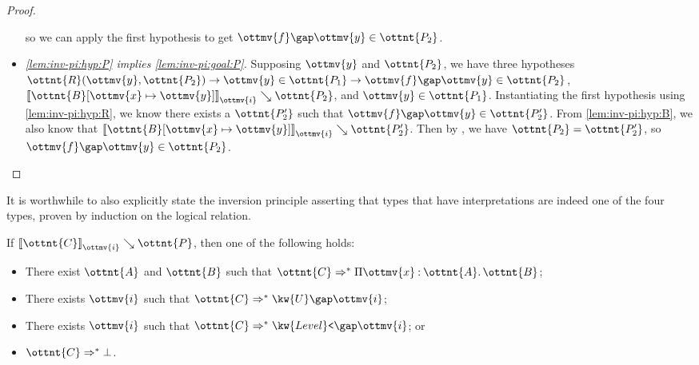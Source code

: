 \documentclass[a4paper,UKenglish,cleveref,autoref,thm-restate]{lipics-v2021}
\begin{document}
\begin{proof}
\begin{itemize}
      so we can apply the first hypothesis to get $  \ottmv{f}  \gap  \ottmv{y}   \in  \ottnt{P_{{\mathrm{2}}}} $.
    \item \textit{\ref{lem:inv-pi:hyp:P} implies \ref{lem:inv-pi:goal:P}.}
      Supposing $\ottmv{y}$ and $\ottnt{P_{{\mathrm{2}}}}$,
      we have three hypotheses $   \ottnt{R} ( \ottmv{y} ,  \ottnt{P_{{\mathrm{2}}}} )   \to   \ottmv{y}  \in  \ottnt{P_{{\mathrm{1}}}}    \to    \ottmv{f}  \gap  \ottmv{y}   \in  \ottnt{P_{{\mathrm{2}}}}  $,
      $ \mathopen{\llbracket}   \ottnt{B} [  \ottmv{x}  \mapsto  \ottmv{y}  ]   \mathclose{\rrbracket}_{ \ottmv{i} } \searrow  \ottnt{P_{{\mathrm{2}}}} $, and $ \ottmv{y}  \in  \ottnt{P_{{\mathrm{1}}}} $.
      Instantiating the first hypothesis using \ref{lem:inv-pi:hyp:R},
      we know there exists a $\ottnt{P'_{{\mathrm{2}}}}$ such that $  \ottmv{f}  \gap  \ottmv{y}   \in  \ottnt{P'_{{\mathrm{2}}}} $.
      From \ref{lem:inv-pi:hyp:B}, we also know that $ \mathopen{\llbracket}   \ottnt{B} [  \ottmv{x}  \mapsto  \ottmv{y}  ]   \mathclose{\rrbracket}_{ \ottmv{i} } \searrow  \ottnt{P'_{{\mathrm{2}}}} $.
      Then by , we have $\ottnt{P_{{\mathrm{2}}}} = \ottnt{P'_{{\mathrm{2}}}}$, so $  \ottmv{f}  \gap  \ottmv{y}   \in  \ottnt{P_{{\mathrm{2}}}} $.
      \qedhere
  \end{itemize}
\end{proof}

It is worthwhile to also explicitly state the inversion principle
asserting that types that have interpretations are indeed one of the four types,
proven by induction on the logical relation.

\begin{lemma}[Inversion (l.r.)] \label{lem:lr:inv}
  If $ \mathopen{\llbracket}  \ottnt{C}  \mathclose{\rrbracket}_{ \ottmv{i} } \searrow  \ottnt{P} $, then one of the following holds:
  \begin{itemize}
    \item There exist $\ottnt{A}$ and $\ottnt{B}$ such that $ \ottnt{C}  \Rightarrow^\ast   \Pi  \ottmv{x}  \mathbin{:}  \ottnt{A}  \mathpunct{.}  \ottnt{B}  $;
    \item There exists $\ottmv{i}$ such that $ \ottnt{C}  \Rightarrow^\ast   \kw{U} \gap   \ottmv{i}   $;
    \item There exists $\ottmv{i}$ such that $ \ottnt{C}  \Rightarrow^\ast   \kw{Level}\texttt{<} \gap   \ottmv{i}   $; or
    \item $ \ottnt{C}  \Rightarrow^\ast   \bot  $.
  \end{itemize}
\end{lemma}
\end{document}

